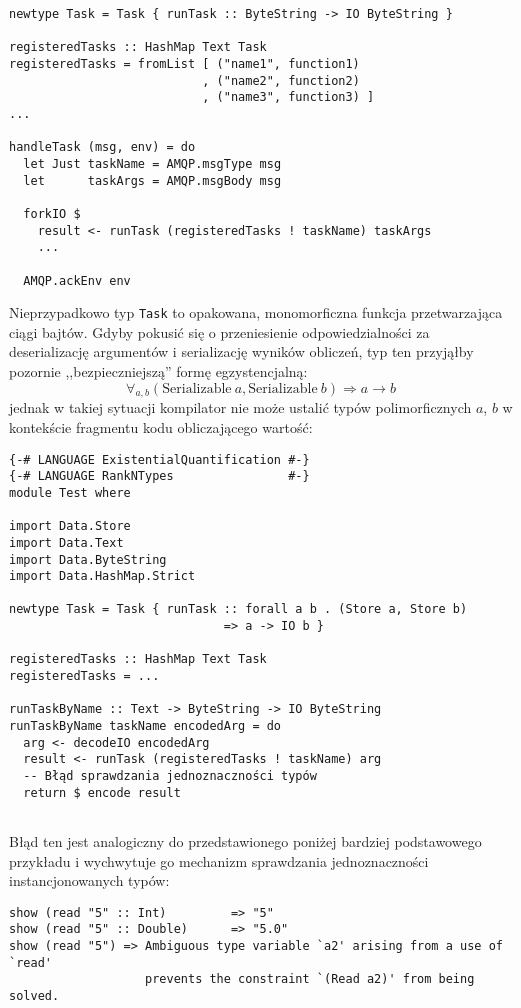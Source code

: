 \begin{lstlisting}[caption=Schemat obsługi zadania]
newtype Task = Task { runTask :: ByteString -> IO ByteString }

registeredTasks :: HashMap Text Task
registeredTasks = fromList [ ("name1", function1)
                           , ("name2", function2)
                           , ("name3", function3) ]
...

handleTask (msg, env) = do
  let Just taskName = AMQP.msgType msg
  let      taskArgs = AMQP.msgBody msg

  forkIO $
    result <- runTask (registeredTasks ! taskName) taskArgs
    ...
  
  AMQP.ackEnv env
\end{lstlisting}
Nieprzypadkowo typ \lstinline{Task} to opakowana, monomorficzna funkcja przetwarzająca ciągi bajtów. Gdyby pokusić się o przeniesienie odpowiedzialności za deserializację argumentów i serializację wyników obliczeń, typ ten przyjąłby pozornie ,,bezpieczniejszą'' formę egzystencjalną:
{\large $$\forall_{a, b} (\mathrm{Serializable}\ a, \mathrm{Serializable}\ b) \Rightarrow a \rightarrow b$$}%
jednak w takiej sytuacji kompilator nie może ustalić typów polimorficznych $a$, $b$ w kontekście fragmentu kodu obliczającego wartość:
\newpage
\begin{lstlisting}[caption=Problem typu zadania zdefiniowanego egzystencjalnie]
{-# LANGUAGE ExistentialQuantification #-}
{-# LANGUAGE RankNTypes                #-}
module Test where

import Data.Store
import Data.Text
import Data.ByteString
import Data.HashMap.Strict

newtype Task = Task { runTask :: forall a b . (Store a, Store b) 
                              => a -> IO b }

registeredTasks :: HashMap Text Task
registeredTasks = ...

runTaskByName :: Text -> ByteString -> IO ByteString
runTaskByName taskName encodedArg = do
  arg <- decodeIO encodedArg
  result <- runTask (registeredTasks ! taskName) arg
  -- Błąd sprawdzania jednoznaczności typów
  return $ encode result
  
\end{lstlisting}

Błąd ten jest analogiczny do przedstawionego poniżej bardziej podstawowego przykładu i wychwytuje go mechanizm sprawdzania jednoznaczności instancjonowanych typów:
\begin{lstlisting}
show (read "5" :: Int)         => "5"
show (read "5" :: Double)      => "5.0"
show (read "5") => Ambiguous type variable `a2' arising from a use of `read'
                   prevents the constraint `(Read a2)' from being solved.
\end{lstlisting}

